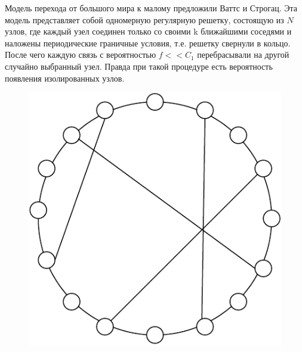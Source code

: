 \documentclass[a4paper]{article}
\begin{document}
Модель перехода от большого мира к малому предложили Ваттс и Строгац. Эта модель представляет собой одномерную регулярную решетку, состоящую из $N$ узлов,
 где каждый узел соединен только со своими k ближайшими соседями и наложены периодические граничные условия, т.е. решетку свернули в кольцо. После чего каждую связь с вероятностью $f<< C_1$ перебрасывали на другой случайно выбранный узел.
 Правда при такой процедуре есть вероятность появления изолированных узлов.

 \begin{figure}[H]
    \begin{center}
	\begin{minipage}[h]{0.4\linewidth}
	\includegraphics[width=1\linewidth]{2соседа.pdf}
	\end{minipage}
	\hfill 
	\begin{minipage}[h]{0.4\linewidth}

\end{minipage}
\end{center}
\end{figure}
\end{document}
